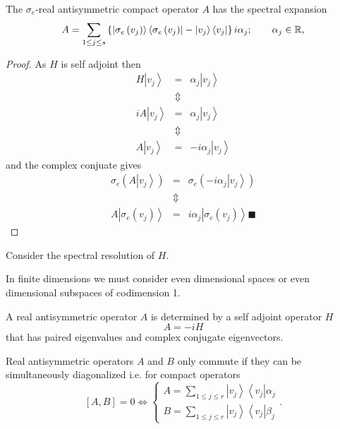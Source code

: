 \begin{corollary}
The $\sigma _{e}$-real antisymmetric compact operator $A$ has the spectral
expansion 
\begin{equation}
A=\sum_{1\leq j\leq s}\left\{ \left\vert \sigma _{e}\left( v_{j}\right)
\right\rangle \left\langle \sigma _{e}\left( v_{j}\right) \right\vert
-\left\vert v_{j}\right\rangle \left\langle v_{j}\right\vert \right\}
i\alpha _{j};\qquad \alpha _{j}\in {\Bbb R},
\end{equation}

\begin{proof}
As $H$ is self adjoint then 
\begin{eqnarray}
H\left\vert v_{j}\right\rangle  &=&\alpha _{j}\left\vert v_{j}\right\rangle 
\\
&\Updownarrow & \\
iA\left\vert v_{j}\right\rangle  &=&\alpha _{j}\left\vert v_{j}\right\rangle 
\\
&\Updownarrow & \\
A\left\vert v_{j}\right\rangle  &=&-i\alpha _{j}\left\vert
v_{j}\right\rangle 
\end{eqnarray}%
and the complex conjuate gives%
\begin{eqnarray}
\sigma _{e}\left( A\left\vert v_{j}\right\rangle \right)  &=&\sigma
_{e}\left( -i\alpha _{j}\left\vert v_{j}\right\rangle \right)  \\
&\Updownarrow & \\
A\left\vert \sigma _{e}\left( v_{j}\right) \right\rangle  &=&i\alpha
_{j}\left\vert \sigma _{e}\left( v_{j}\right) \right\rangle \blacksquare 
\end{eqnarray}
\end{proof} Consider the spectral resolution of $H.$
\end{corollary}

\begin{remark}
\bigskip In finite dimensions we must consider even dimensional spaces or
even dimensional subspaces of codimension 1.
\end{remark}

\begin{lemma}
A real antisymmetric operator $A$ is determined by a self adjoint operator $%
H $ 
\begin{equation}
A=-iH
\end{equation}%
that has paired eigenvalues and complex conjugate eigenvectors.
\end{lemma}

\begin{lemma}
Real antisymmetric operators $A$ and $B$ only commute if they can be
simultaneously diagonalized i.e. for compact operators 
\begin{equation}
\left[ A,B\right] =0\Longleftrightarrow \left\{ 
\begin{array}{c}
A=\sum\limits_{1\leq j\leq r}\left\vert v_{j}\right\rangle \left\langle
v_{j}\right\vert \alpha _{j} \\ 
B=\sum\limits_{1\leq j\leq r}\left\vert v_{j}\right\rangle \left\langle
v_{j}\right\vert \beta _{j}%
\end{array}%
\right. .
\end{equation}
\end{lemma}

